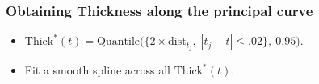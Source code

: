 \documentclass[9 pt]{beamer}
\begin{document}
\begin{frame}
\frametitle{Obtaining Thickness along the principal curve}
\begin{itemize}
\item<2-| alert@2> $\text{Thick}^*(t)=\text{Quantile}\big(\{2\times \text{dist}_{t_{j}},\big||t_{j}-t|\le.02\},\ 0.95\big)$.
\item<3-| alert@3> Fit a smooth spline across all $\text{Thick}^*(t)$.
\end{itemize}
\begin{figure}[ht]
\begin{minipage}[b]{0.45\linewidth}
\centering
{}
\end{minipage}
\begin{minipage}[b]{0.45\linewidth}
\centering
{}

\end{minipage}
\end{figure}
\end{frame}
\end{document}
